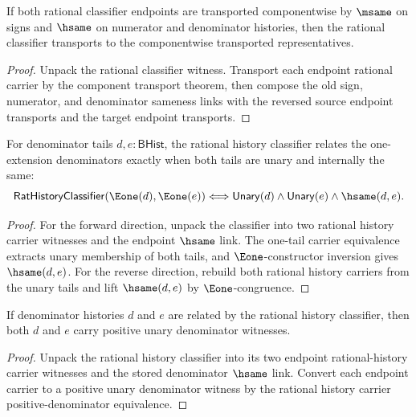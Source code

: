 \begin{theorem}
\label{thm:rat-classifier-component-transport}
If both rational classifier endpoints are transported componentwise by
\(\msame\) on signs and \(\hsame\) on numerator and denominator histories,
then the rational classifier transports to the componentwise transported
representatives.
\end{theorem}
\begin{proof}
Unpack the rational classifier witness. Transport each endpoint rational
carrier by the component transport theorem, then compose the old sign,
numerator, and denominator sameness links with the reversed source endpoint
transports and the target endpoint transports.
\end{proof}

\begin{theorem}
\label{thm:rat-history-classifier-e1-tail-unary-iff}
For denominator tails \(d,e:\mathsf{BHist}\), the rational history classifier
relates the one-extension denominators exactly when both tails are unary and
internally the same:
$$
\mathsf{RatHistoryClassifier}(\Eone(d),\Eone(e))
\Longleftrightarrow
\mathsf{Unary}(d)\land \mathsf{Unary}(e)\land \hsame(d,e).
$$
\end{theorem}
\begin{proof}
For the forward direction, unpack the classifier into two rational history
carrier witnesses and the endpoint \(\hsame\) link. The one-tail carrier
equivalence extracts unary membership of both tails, and \(\Eone\)-constructor
inversion gives \(\hsame(d,e)\). For the reverse direction, rebuild both
rational history carriers from the unary tails and lift \(\hsame(d,e)\) by
\(\Eone\)-congruence.
\end{proof}

\begin{theorem}
\label{thm:rat-history-classifier-positive-denominators}
If denominator histories $d$ and $e$ are related by the rational history
classifier, then both $d$ and $e$ carry positive unary denominator witnesses.
\end{theorem}
\begin{proof}
Unpack the rational history classifier into its two endpoint rational-history
carrier witnesses and the stored denominator $\hsame$ link. Convert each
endpoint carrier to a positive unary denominator witness by the rational history
carrier positive-denominator equivalence.
\end{proof}

